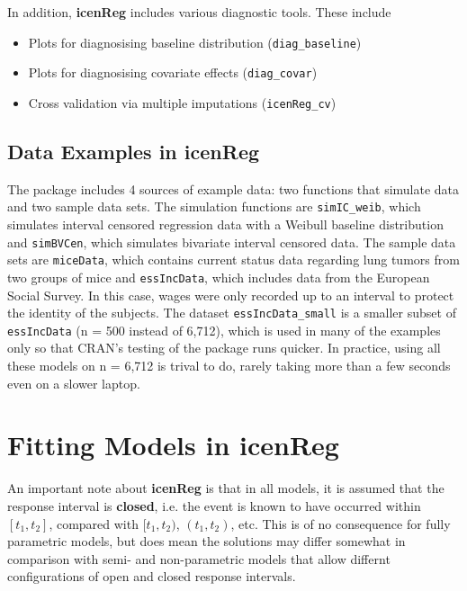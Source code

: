 \documentclass[11pt]{report}
\begin{document}
  In addition, {\bf{icenReg}} includes various diagnostic tools. These include
  
  \begin{itemize}
  
    \item Plots for diagnosising baseline distribution (\texttt{diag\_baseline})
    
    \item Plots for diagnosising covariate effects (\texttt{diag\_covar})
    
    \item Cross validation via multiple imputations (\texttt{icenReg\_cv})
  
  \end{itemize}
  
  
  \section{Data Examples in {\bf{icenReg}} }
  
  The package includes 4 sources of example data: two functions that simulate data and
  two sample data sets. The simulation functions are \texttt{simIC\_weib}, which simulates
  interval censored regression data with a Weibull baseline distribution and 
  \texttt{simBVCen}, which simulates bivariate interval censored data. The sample data sets
  are \texttt{miceData}, which contains current status data regarding lung tumors 
  from two groups of mice and \texttt{essIncData}, which includes data from the European
  Social Survey. In this case, wages were only recorded up to an interval to 
  protect the identity of the subjects. The dataset \texttt{essIncData\_small} is a smaller
  subset of \texttt{essIncData} (n = 500 instead of 6,712), which is used in many of 
  the examples only so that CRAN's testing of the package runs quicker. In practice,
  using all these models on n = 6,712 is trival to do, rarely taking more than a few seconds
  even on a slower laptop. 
  
  
  \chapter{Fitting Models in {\bf{icenReg}} }
  
  An important note about {\bf icenReg} is that in all models, it is assumed that the 
  response interval is {\bf closed}, i.e. the event is known to have occurred within 
  $[t_1, t_2]$, compared with $[t_1, t_2)$, $(t_1, t_2)$, etc. This is of no consequence 
  for fully parametric models, but does mean the solutions may differ somewhat in 
  comparison with semi- and non-parametric models that allow differnt configurations
  of open and closed response intervals. 
  
\end{document}
